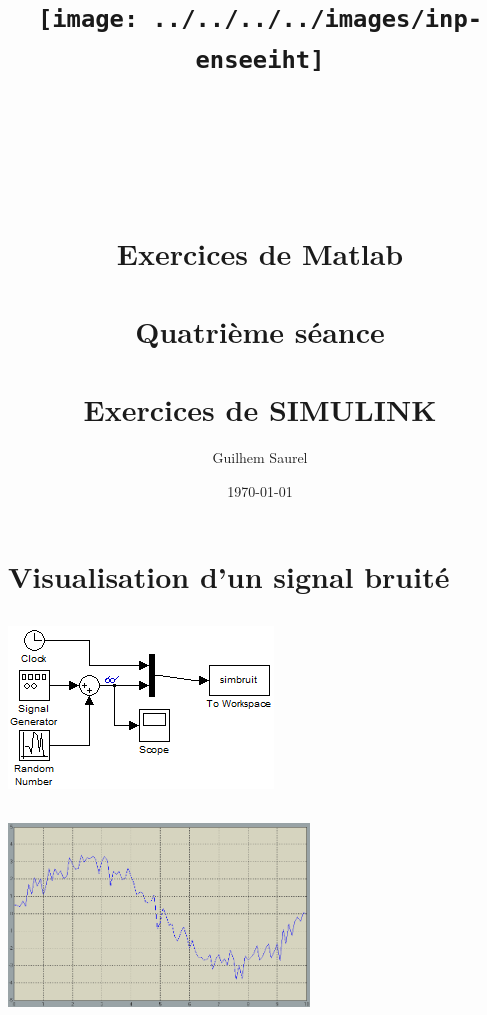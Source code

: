 \documentclass[10pt]{article}
\title{\texttt{[image: ../../../../images/inp-enseeiht]} \\ ~ \\ ~ \\ ~ \\ ~ \\ Exercices de Matlab \\ ~ \\ Quatrième séance \\ ~ \\ Exercices de SIMULINK}
\author{Guilhem Saurel}
\date{\today}
\begin{document}
 \begin{titlepage}
  \maketitle
  \tableofcontents
 \end{titlepage}

 \section{Visualisation d’un signal bruité}
  \subsection{}
   \begin{center}
    \includegraphics{1a}
   \end{center}
  \subsection{}
   \begin{center}
    \includegraphics[width=8cm]{1b}
   \end{center}
  \subsection{}
   \inputminted{matlab}{1c.txt}
\end{document}
